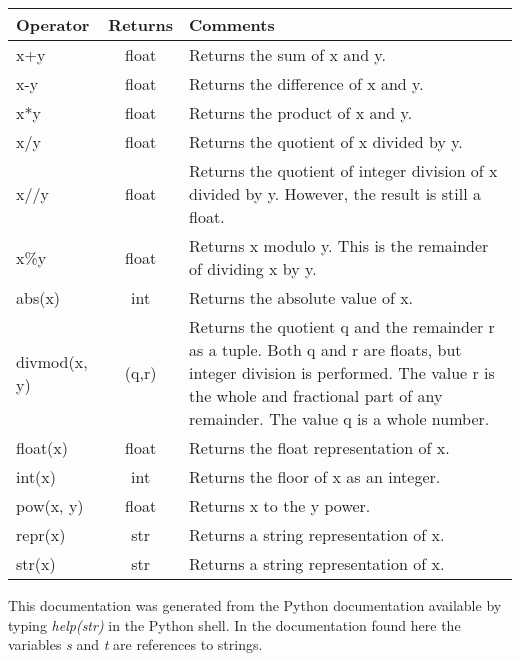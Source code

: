 \begin{center}
{\small
\begin{tabular}{|l|c|p{2.2in}|} \hline
{\bf Operator} & {\bf Returns} & {\bf Comments} \\ \hline\hline 
x+y& float & Returns the sum of x and y.
 \\ \hline
 x-y & float & Returns the difference of x and y.
 \\ \hline
 x*y & float & Returns the product of x and y.
 \\ \hline 
 x/y & float & Returns the quotient of x divided by y.
 \\ \hline
 x//y & float & Returns the quotient of integer division of x divided by y. However, the result is still a float. 
 \\ \hline
 x\%y & float & Returns x modulo y. This is the remainder of dividing x by y. 
 \\ \hline
 abs(x) & int & Returns the absolute value of x.
 \\ \hline
 divmod(x, y) & (q,r) & Returns the quotient q and the remainder r as a tuple. Both q and r are floats, but integer division is performed. The value r is the whole and fractional part of any remainder. The value q is a whole number.
 \\ \hline
 float(x) & float & Returns the float representation of x.
 \\ \hline
 int(x) & int & Returns the floor of x as an integer.
 \\ \hline 
 pow(x, y) & float & Returns x to the y power.
  \\ \hline
 repr(x) & str & Returns a string representation of x.
 \\ \hline
 str(x) & str & Returns a string representation of x.
 \\ \hline
 \end{tabular}}
\end{center}
\newpage


\label{strmethods}

This documentation was generated from the Python documentation available by typing {\em help(str)} in the Python shell. In the documentation found here the variables {\em s} and {\em t} are references to strings.


